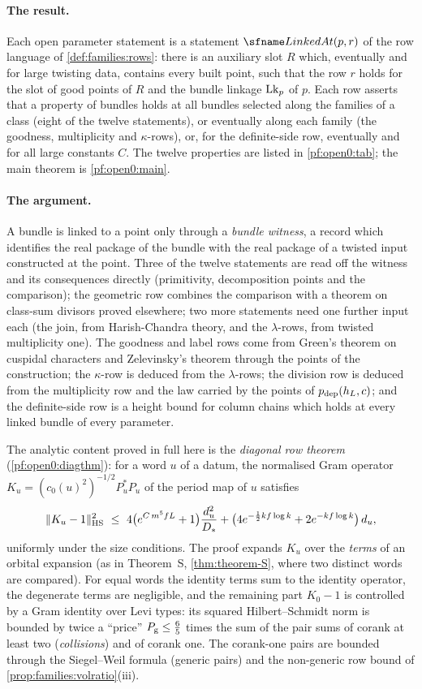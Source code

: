 \paragraph{The result.}
Each open parameter statement is a statement $\openzeroLinked(p,r)$ of the row language of \cref{def:families:rows}:
there is an auxiliary slot $R$ which, eventually and for large twisting data, contains every built point, such that the
row $r$ holds for the slot of good points of $R$ and the bundle linkage $\mathrm{Lk}_p$ of $p$. Each row asserts that a
property of bundles holds at all bundles selected along the families of a class (eight of the twelve statements), or
eventually along each family (the goodness, multiplicity and $\kappa$-rows), or, for the definite-side row,
eventually and for all large constants $C$. The twelve properties are listed in \cref{pf:open0:tab}; the main theorem is
\cref{pf:open0:main}.

\paragraph{The argument.}
A bundle is linked to a point only through a \emph{bundle witness}, a record which identifies the real package of the
bundle with the real package of a twisted input constructed at the point. Three of the twelve statements are read off
the witness and its consequences directly (primitivity, decomposition points and the comparison); the geometric row
combines the comparison with a theorem on class-sum divisors proved elsewhere; two more statements need one further
input each (the join, from Harish-Chandra theory, and the $\lambda$-rows, from twisted multiplicity one). The goodness and
label rows come from Green's theorem on cuspidal characters and Zelevinsky's
theorem through the points of the construction; the $\kappa$-row is deduced from the $\lambda$-rows; the division row
is deduced from the multiplicity row and the law carried by the points of $p_{\mathrm{dep}}(h_L,c)$; and the definite-side
row is a height bound for column chains which holds at every linked bundle of every parameter.

The analytic content proved in full here is the \emph{diagonal row theorem} (\cref{pf:open0:diagthm}): for a word $u$ of
a datum, the normalised Gram operator $K_u=(c_0(u)^2)^{-1/2}P_u^*P_u$ of the period map of $u$ satisfies
\[
\openzeroHS{K_u-1}^2\ \le\ 4\bigl(e^{C\,m^5fL}+1\bigr)\frac{d_u^2}{D_*}+\bigl(4e^{-\frac12kf\log k}+2e^{-kf\log k}\bigr)\,d_u ,
\]
uniformly under the size conditions. The proof expands $K_u$ over the \emph{terms} of an orbital expansion (as in
Theorem~S, \cref{thm:theorem-S}, where two distinct words are compared). For equal words the identity terms sum to the
identity operator, the degenerate terms are negligible, and the remaining part $K_0-1$ is controlled by a Gram identity
over Levi types: its squared Hilbert--Schmidt norm is bounded by twice a ``price'' $P_{\mathrm g}\le\frac65$ times the sum of the
pair sums of corank at least two (\emph{collisions}) and of corank one. The corank-one pairs are bounded through the
Siegel--Weil formula (generic pairs) and the non-generic row bound of \cref{prop:families:volratio}(iii).

